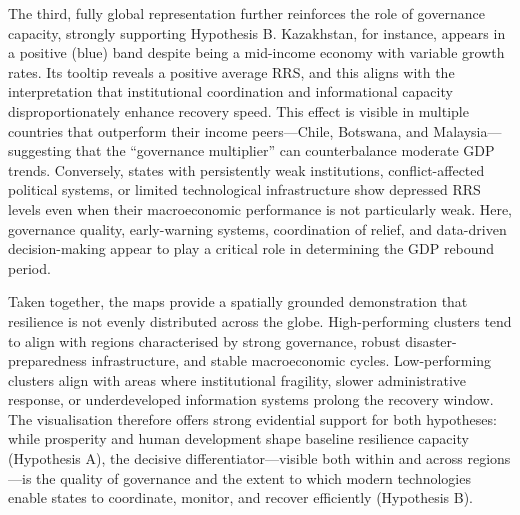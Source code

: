 \documentclass[conference]{IEEEtran}
\begin{document}
The third, fully global representation further reinforces the role of governance capacity, strongly supporting Hypothesis B. Kazakhstan, for instance, appears in a positive (blue) band despite being a mid-income economy with variable growth rates. Its tooltip reveals a positive average RRS, and this aligns with the interpretation that institutional coordination and informational capacity disproportionately enhance recovery speed. This effect is visible in multiple countries that outperform their income peers—Chile, Botswana, and Malaysia—suggesting that the “governance multiplier” can counterbalance moderate GDP trends. Conversely, states with persistently weak institutions, conflict-affected political systems, or limited technological infrastructure show depressed RRS levels even when their macroeconomic performance is not particularly weak. Here, governance quality, early-warning systems, coordination of relief, and data-driven decision-making appear to play a critical role in determining the GDP rebound period.

Taken together, the maps provide a spatially grounded demonstration that resilience is not evenly distributed across the globe. High-performing clusters tend to align with regions characterised by strong governance, robust disaster-preparedness infrastructure, and stable macroeconomic cycles. Low-performing clusters align with areas where institutional fragility, slower administrative response, or underdeveloped information systems prolong the recovery window. The visualisation therefore offers strong evidential support for both hypotheses: while prosperity and human development shape baseline resilience capacity (Hypothesis A), the decisive differentiator—visible both within and across regions—is the quality of governance and the extent to which modern technologies enable states to coordinate, monitor, and recover efficiently (Hypothesis B).
\end{document}
